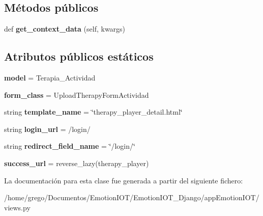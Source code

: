 \subsection*{Métodos públicos}
\begin{DoxyCompactItemize}
\item 
def {\bfseries get\+\_\+context\+\_\+data} (self, kwargs)\hypertarget{classappEmotionIOT_1_1views_1_1Add__therapy__player_ade76be1ca825b87d49f2c5ceb51d6ec4}{}\label{classappEmotionIOT_1_1views_1_1Add__therapy__player_ade76be1ca825b87d49f2c5ceb51d6ec4}

\end{DoxyCompactItemize}
\subsection*{Atributos públicos estáticos}
\begin{DoxyCompactItemize}
\item 
{\bfseries model} = Terapia\+\_\+\+Actividad\hypertarget{classappEmotionIOT_1_1views_1_1Add__therapy__player_a6b77fe8dc31c465f35f9113e37396cca}{}\label{classappEmotionIOT_1_1views_1_1Add__therapy__player_a6b77fe8dc31c465f35f9113e37396cca}

\item 
{\bfseries form\+\_\+class} = Upload\+Therapy\+Form\+Actividad\hypertarget{classappEmotionIOT_1_1views_1_1Add__therapy__player_acf4545eb326621e1036fb00ccd944f3b}{}\label{classappEmotionIOT_1_1views_1_1Add__therapy__player_acf4545eb326621e1036fb00ccd944f3b}

\item 
string {\bfseries template\+\_\+name} = \char`\"{}therapy\+\_\+player\+\_\+detail.\+html\char`\"{}\hypertarget{classappEmotionIOT_1_1views_1_1Add__therapy__player_afc10ed3b9debea73d474df94938c272e}{}\label{classappEmotionIOT_1_1views_1_1Add__therapy__player_afc10ed3b9debea73d474df94938c272e}

\item 
string {\bfseries login\+\_\+url} = \textquotesingle{}/login/\textquotesingle{}\hypertarget{classappEmotionIOT_1_1views_1_1Add__therapy__player_a0eddf2532ecf0365c0ed26d4ba5509e8}{}\label{classappEmotionIOT_1_1views_1_1Add__therapy__player_a0eddf2532ecf0365c0ed26d4ba5509e8}

\item 
string {\bfseries redirect\+\_\+field\+\_\+name} = \char`\"{}/login/\char`\"{}\hypertarget{classappEmotionIOT_1_1views_1_1Add__therapy__player_a55dd20b64200e6ea39f4fe03475c5e53}{}\label{classappEmotionIOT_1_1views_1_1Add__therapy__player_a55dd20b64200e6ea39f4fe03475c5e53}

\item 
{\bfseries success\+\_\+url} = reverse\+\_\+lazy(\textquotesingle{}therapy\+\_\+player\textquotesingle{})\hypertarget{classappEmotionIOT_1_1views_1_1Add__therapy__player_a2473724ceac87fed2b0d0fa8ef448183}{}\label{classappEmotionIOT_1_1views_1_1Add__therapy__player_a2473724ceac87fed2b0d0fa8ef448183}

\end{DoxyCompactItemize}


La documentación para esta clase fue generada a partir del siguiente fichero\+:\begin{DoxyCompactItemize}
\item 
/home/grego/\+Documentos/\+Emotion\+I\+O\+T/\+Emotion\+I\+O\+T\+\_\+\+Django/app\+Emotion\+I\+O\+T/views.\+py\end{DoxyCompactItemize}
